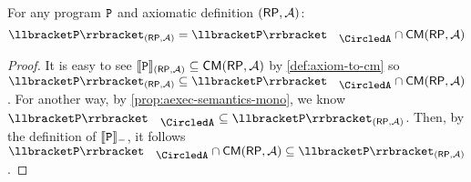 \begin{theorem}
\label{thm:consistency-intersect-anarchic}
For any program $\mathtt{P}$ and axiomatic definition $(\RP, \Ax)$:
\[
\interpr{\prog}_{(\RP, \Ax)} = \interpr{\prog}_{\anarchic} \cap \CMa(\RP, \Ax)
\]
\end{theorem}
\begin{proof}
    It is easy to see \( \interpr{\prog}_{(\RP, \Ax)} \subseteq \CMa(\RP, \Ax) \) by \cref{def:axiom-to-cm} 
    so \( \interpr{\prog}_{(\RP, \Ax)} \subseteq \interpr{\prog}_{\anarchic} \cap \CMa(\RP, \Ax) \).
    For another way, by \cref{prop:aexec-semantics-mono}, 
    we know \( \interpr{\prog}_{\anarchic} \subseteq \interpr{\prog}_{(\RP, \Ax)} \).
    Then, by the definition of \( \llbracket \mathtt{P} \rrbracket_{-} \), it follows
    \( \interpr{\prog}_{\anarchic} \cap \CMa(\RP, \Ax) \subseteq \interpr{\prog}_{(\RP, \Ax)} \).
\end{proof}


